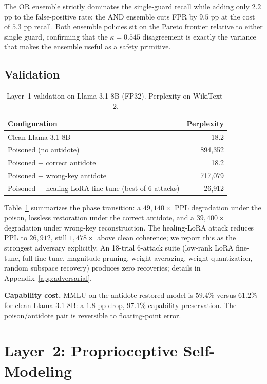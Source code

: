 \documentclass[10pt,letterpaper]{article}
\theoremstyle{definition}
\theoremstyle{plain}
\begin{document}
The OR ensemble strictly dominates the single-guard recall while
adding only $2.2$ pp to the false-positive rate; the AND ensemble cuts
FPR by $9.5$ pp at the cost of $5.3$ pp recall. Both ensemble policies
sit on the Pareto frontier relative to either single guard, confirming
that the $\kappa = 0.545$ disagreement is exactly the variance that
makes the ensemble useful as a safety primitive.

\subsection{Validation}
\label{sec:layer1-validation}

\begin{table}[t]
\centering
\caption{Layer~1 validation on Llama-3.1-8B (FP32). Perplexity on
WikiText-2.}
\label{tab:layer1}
\begin{tabular}{lr}
\toprule
\textbf{Configuration} & \textbf{Perplexity} \\
\midrule
Clean Llama-3.1-8B & 18.2 \\
Poisoned (no antidote) & 894{,}352 \\
Poisoned + correct antidote & 18.2 \\
Poisoned + wrong-key antidote & 717{,}079 \\
Poisoned + healing-LoRA fine-tune (best of 6 attacks) & 26{,}912 \\
\bottomrule
\end{tabular}
\end{table}

Table~\ref{tab:layer1} summarizes the phase transition: a $49{,}140\times$
PPL degradation under the poison, lossless restoration under the correct
antidote, and a $39{,}400\times$ degradation under wrong-key reconstruction.
The healing-LoRA attack reduces PPL to $26{,}912$, still $1{,}478\times$
above clean coherence; we report this as the strongest adversary
explicitly. An 18-trial 6-attack suite (low-rank LoRA fine-tune, full
fine-tune, magnitude pruning, weight averaging, weight quantization, random
subspace recovery) produces zero recoveries; details in
Appendix~\ref{app:adversarial}.

\textbf{Capability cost.} MMLU on the antidote-restored model is $59.4\%$
versus $61.2\%$ for clean Llama-3.1-8B: a $1.8$ pp drop, $97.1\%$
capability preservation. The poison/antidote pair is reversible to
floating-point error.

\section{Layer~2: Proprioceptive Self-Modeling}
\label{sec:layer2}
\end{document}
